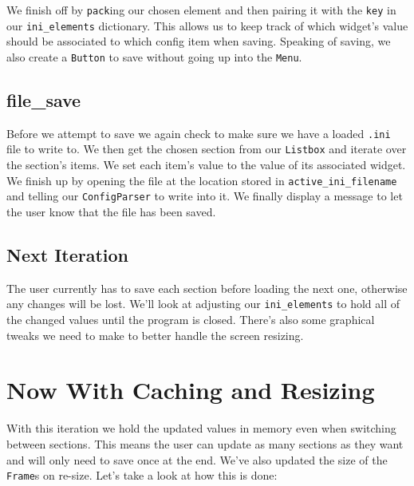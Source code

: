 \documentclass[a4paper,11pt,openany]{book}
\begin{document}
\vspace{5mm}

We finish off by \lstinline[columns=fixed]{pack}ing our chosen element and then pairing it with the \lstinline[columns=fixed]{key} in our \lstinline[columns=fixed]{ini_elements} dictionary. This allows us to keep track of which widget's value should be associated to which config item when saving. Speaking of saving, we also create a \lstinline[columns=fixed]{Button} to save without going up into the \lstinline[columns=fixed]{Menu}. 

\subsection{file\_save}

Before we attempt to save we again check to make sure we have a loaded \lstinline[columns=fixed]{.ini} file to write to. We then get the chosen section from our \lstinline[columns=fixed]{Listbox} and iterate over the section's items. We set each item's value to the value of its associated widget. We finish up by opening the file at the location stored in \lstinline[columns=fixed]{active_ini_filename} and telling our \lstinline[columns=fixed]{ConfigParser} to write into it. We finally display a message to let the user know that the file has been saved. 

\subsection{Next Iteration}

The user currently has to save each section before loading the next one, otherwise any changes will be lost. We'll look at adjusting our \lstinline[columns=fixed]{ini_elements} to hold all of the changed values until the program is closed. There's also some graphical tweaks we need to make to better handle the screen resizing. 

\newpage

\section{Now With Caching and Resizing}

With this iteration we hold the updated values in memory even when switching between sections. This means the user can update as many sections as they want and will only need to save once at the end. We've also updated the size of the \lstinline[columns=fixed]{Frame}s on re-size. Let's take a look at how this is done:
\end{document}
